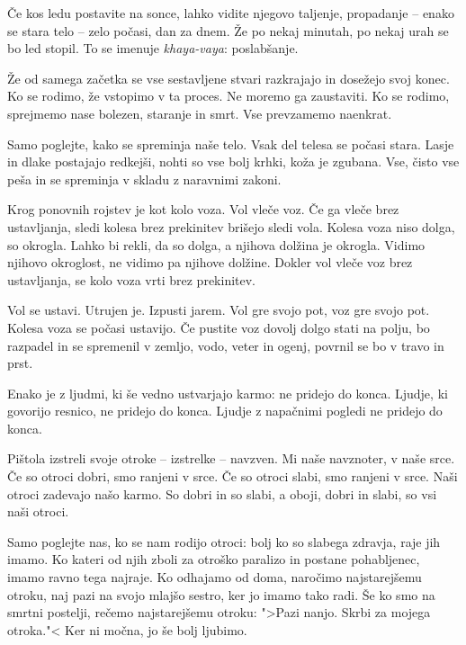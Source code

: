 \clearpage


Če kos ledu postavite na sonce, lahko vidite njegovo taljenje, propadanje – enako se stara telo – zelo počasi, dan za dnem. Že po nekaj minutah, po nekaj urah se bo led stopil. To se imenuje \emph{khaya-vaya}: poslabšanje.

Že od samega začetka se vse sestavljene stvari razkrajajo in dosežejo svoj konec. Ko se rodimo, že vstopimo v ta proces. Ne moremo ga zaustaviti. Ko se rodimo, sprejmemo nase bolezen, staranje in smrt. Vse prevzamemo naenkrat.

Samo poglejte, kako se spreminja naše telo. Vsak del telesa se počasi stara. Lasje  in dlake postajajo redkejši, nohti so vse bolj krhki, koža je zgubana. Vse, čisto vse peša in se spreminja v skladu z naravnimi zakoni.

\clearpage


Krog ponovnih rojstev je kot kolo voza. Vol vleče voz. Če ga vleče brez ustavljanja, sledi kolesa brez prekinitev brišejo sledi vola. Kolesa voza niso dolga, so okrogla. Lahko bi rekli, da so dolga, a njihova dolžina je okrogla. Vidimo njihovo okroglost, ne vidimo pa njihove dolžine. Dokler vol vleče voz brez ustavljanja, se kolo voza vrti brez prekinitev.

Vol se ustavi. Utrujen je. Izpusti jarem. Vol gre svojo pot, voz gre svojo pot. Kolesa voza se počasi ustavijo. Če pustite voz dovolj dolgo stati na polju, bo razpadel in se spremenil v zemljo, vodo, veter in ogenj, povrnil se bo v travo in prst.

Enako je z ljudmi, ki še vedno ustvarjajo karmo: ne pridejo do konca. Ljudje, ki govorijo resnico, ne pridejo do konca. Ljudje z napačnimi pogledi ne pridejo do konca.

\clearpage


Pištola izstreli svoje otroke – izstrelke – navzven. Mi naše navznoter, v naše srce. Če so otroci dobri, smo ranjeni v srce. Če so otroci slabi, smo ranjeni v srce. Naši otroci zadevajo našo karmo. So dobri in so slabi, a oboji, dobri in slabi, so vsi naši otroci.

Samo poglejte nas, ko se nam rodijo otroci: bolj ko so slabega zdravja, raje jih imamo. Ko kateri od njih zboli za otroško paralizo in postane pohabljenec, imamo ravno tega najraje. Ko odhajamo od doma, naročimo najstarejšemu otroku, naj pazi na svojo mlajšo sestro, ker jo imamo tako radi. Še ko smo na smrtni postelji, rečemo najstarejšemu otroku: ">Pazi nanjo. Skrbi za mojega otroka."< Ker ni močna, jo še bolj ljubimo.

